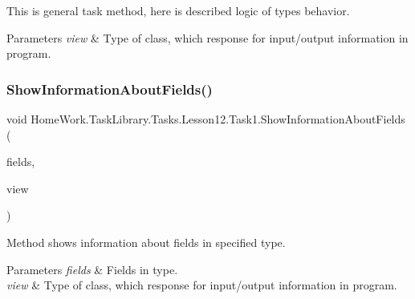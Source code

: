 This is general task method, here is described logic of types behavior. 


\begin{DoxyParams}{Parameters}
{\em view} & Type of class, which response for input/output information in program.\\
\hline
\end{DoxyParams}
\mbox{\label{class_home_work_1_1_task_library_1_1_tasks_1_1_lesson12_1_1_task1_aac4982552cfe5b716785f4ba5dc158a1}} 
\subsubsection{\texorpdfstring{ShowInformationAboutFields()}{ShowInformationAboutFields()}}
{\footnotesize\ttfamily void Home\+Work.\+Task\+Library.\+Tasks.\+Lesson12.\+Task1.\+Show\+Information\+About\+Fields (\begin{DoxyParamCaption}\item[{Field\+Info \mbox{[}$\,$\mbox{]}}]{fields,  }\item[{I\+Information}]{view }\end{DoxyParamCaption})\hspace{0.3cm}{\ttfamily [private]}}



Method shows information about fields in specified type. 


\begin{DoxyParams}{Parameters}
{\em fields} & Fields in type.\\
\hline
{\em view} & Type of class, which response for input/output information in program.\\
\hline
\end{DoxyParams}
\mbox{\label{class_home_work_1_1_task_library_1_1_tasks_1_1_lesson12_1_1_task1_ae134abb25931e210bf52357ff95e2873}} 
